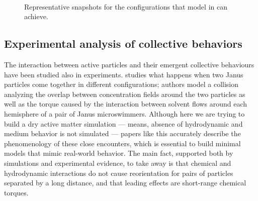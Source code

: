 \documentclass[../../master_thesis_np.tex]{subfiles}
\begin{document}
	\begin{figure}[htp]
		\centering
		 \\
		\caption{Representative snapshots for the configurations that model in \cite{negi_emergent_2022} can achieve.}
		\label{fig:negi_vision2}
	\end{figure}
	
	\subsection{Experimental analysis of collective behaviors}
	The interaction between active particles and their emergent collective behaviours have been studied also in experiments. 
	\cite{singh_pair_2024} studies what happens when two  Janus particles come together in different configurations; authors model a collision analyzing the overlap between concentration fields around the two particles as well as the torque caused by the interaction between solvent flows around each hemisphere of a pair of Janus microswimmers.%
	Although here we are trying to build a dry active matter simulation --- means, absence of hydrodynamic and medium behavior is not simulated --- papers like this accurately describe the phenomenology of these close encounters, which is essential to build minimal models that mimic real-world behavior. 
	The main fact, supported both by simulations and experimental evidence, to take away is that chemical and hydrodynamic interactions do not cause reorientation for pairs of particles separated by a long distance, and that leading effects are short-range chemical torques.%
	
\end{document}
